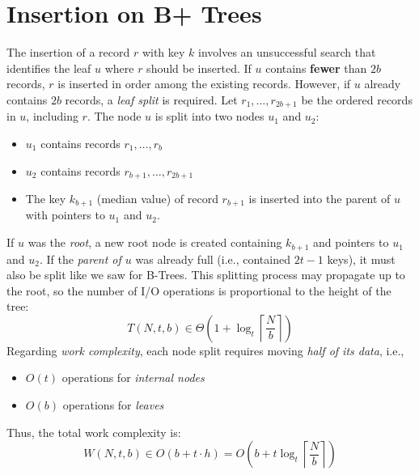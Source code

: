 \documentclass{report}
\begin{document}
\section{Insertion on B+ Trees}
The insertion of a record \( r \) with key \( k \) involves an unsuccessful search that identifies the leaf \( u \) where \( r \) should be inserted.  
If \( u \) contains \textbf{fewer} than \( 2b \) records, \( r \) is inserted in order among the existing records.  
However, if \( u \) already contains \( 2b \) records, a \textit{leaf split} is required.
\noindent
Let \( r_1, \dots, r_{2b+1} \) be the ordered records in \( u \), including \( r \).  
The node \( u \) is split into two nodes \( u_1 \) and \( u_2 \):  
\begin{itemize}
    \item \( u_1 \) contains records \( r_1, \dots, r_b \)  
    \item \( u_2 \) contains records \( r_{b+1}, \dots, r_{2b+1} \)  
    \item The key \( k_{b+1} \) (median value) of record \( r_{b+1} \) is inserted into the parent of \( u \) with pointers to \( u_1 \) and \( u_2 \).  
\end{itemize}
If \( u \) was the \textit{root}, a new root node is created containing \( k_{b+1} \) and pointers to \( u_1 \) and \( u_2 \).  
If the \textit{parent of \( u \)} was already full (i.e., contained \( 2t - 1 \) keys), it must also be split like we saw for B-Trees.  
This splitting process may propagate up to the root, so the number of I/O operations is proportional to the height of the tree:
\begin{equation}
T(N,t,b) \in \Theta \left( 1 + \log_t \left\lceil \frac{N}{b} \right\rceil \right)
\end{equation}
\noindent
Regarding \textit{work complexity}, each node split requires moving \textit{half of its data}, i.e.,  
\begin{itemize}
    \item \( O(t) \) operations for \textit{internal nodes}  
    \item \( O(b) \) operations for \textit{leaves}  
\end{itemize}
\noindent Thus, the total work complexity is:
\begin{equation}
W(N,t,b) \in O \left( b + t \cdot h \right) = O \left( b + t \log_t \left\lceil \frac{N}{b} \right\rceil \right)
\end{equation}
\end{document}
